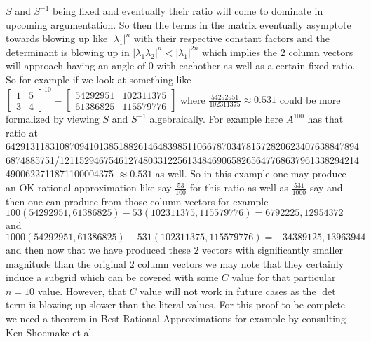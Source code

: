 $S$ and $S^{-1}$ being fixed and eventually their ratio will come to dominate in upcoming argumentation. So then the terms in the matrix eventually asymptote towards blowing up like $|\lambda_1|^n$ with their respective constant factors and the determinant is blowing up in $|\lambda_1\lambda_2|^n<|\lambda_1|^{2n}$ which implies the $2$ column vectors will approach having an angle of $0$ with eachother as well as a certain fixed ratio. So for example if we look at something like $\begin{bmatrix} 1 & 5 \\ 3 & 4 \end{bmatrix}^10=\begin{bmatrix} 54292951 & 102311375 \\ 61386825 & 115579776 \end{bmatrix}$ where $\frac{54292951}{102311375} \approx 0.531$ could be more formalized by viewing $S$ and $S^{-1}$ algebraically. For example here $A^{100}$ has that ratio at 6429131183108709410138518826146483985110667870347815728206234076388478946874885751/12115294675461274803312256134846906582656477686379613382942144900622711871100004375 $\approx 0.531$ as well. So in this example one may produce an OK rational approximation like say $\frac{53}{100}$ for this ratio as well as $\frac{531}{1000}$ say and then one can produce from those column vectors for example $100 (54292951, 61386825) - 53 (102311375, 115579776) = {6792225, 12954372}$ and $1000 (54292951, 61386825) - 531 (102311375, 115579776) = {-34389125, 13963944}$ and then now that we have produced these $2$ vectors with significantly smaller magnitude than the original $2$ column vectors we may note that they certainly induce a subgrid which can be covered with some $C$ value for that particular $n=10$ value. However, that $C$ value will not work in future cases as the $\det$ term is blowing up slower than the literal values. For this proof to be complete we need a theorem in Best Rational Approximations for example by consulting Ken Shoemake et al.


